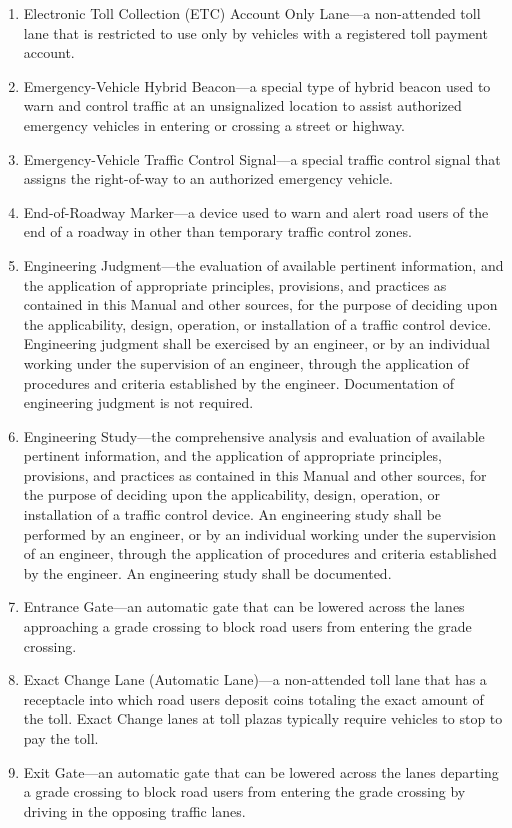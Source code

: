 \documentclass[9pt]{memoir}
\begin{document}
{\begin{enumerate}[label=\arabic*., ref=\arabic*]
\item Electronic Toll Collection (ETC) Account Only Lane---a non-attended toll lane that is restricted to use only by vehicles with a registered toll payment account.
\item Emergency-Vehicle Hybrid Beacon---a special type of hybrid beacon used to warn and control traffic at an unsignalized location to assist authorized emergency vehicles in entering or crossing a street or highway.
\item Emergency-Vehicle Traffic Control Signal---a special traffic control signal that assigns the right-of-way to an authorized emergency vehicle.
\item End-of-Roadway Marker---a device used to warn and alert road users of the end of a roadway in other than temporary traffic control zones.
\item Engineering Judgment---the evaluation of available pertinent information, and the application of appropriate principles, provisions, and practices as contained in this Manual and other sources, for the purpose of deciding upon the applicability, design, operation, or installation of a traffic control device. Engineering judgment shall be exercised by an engineer, or by an individual working under the supervision of an engineer, through the application of procedures and criteria established by the engineer. Documentation of engineering judgment is not required.
\item Engineering Study---the comprehensive analysis and evaluation of available pertinent information, and the application of appropriate principles, provisions, and practices as contained in this Manual and other sources, for the purpose of deciding upon the applicability, design, operation, or installation of a traffic control device. An engineering study shall be performed by an engineer, or by an individual working under the supervision of an engineer, through the application of procedures and criteria established by the engineer. An engineering study shall be documented.
\item Entrance Gate---an automatic gate that can be lowered across the lanes approaching a grade crossing to block road users from entering the grade crossing.
\item Exact Change Lane (Automatic Lane)---a non-attended toll lane that has a receptacle into which road users deposit coins totaling the exact amount of the toll. Exact Change lanes at toll plazas typically require vehicles to stop to pay the toll.
\item Exit Gate---an automatic gate that can be lowered across the lanes departing a grade crossing to block road users from entering the grade crossing by driving in the opposing traffic lanes.

\end{enumerate}}
\end{document}
